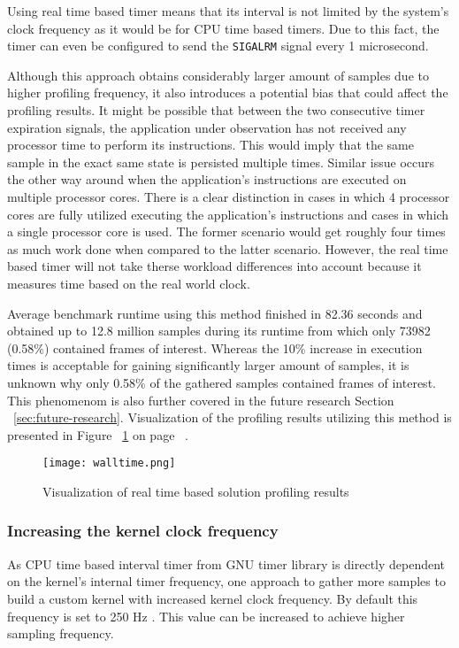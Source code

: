 \documentclass[..thesis.tex]{subfiles}
\begin{document}
Using real time based timer means that its interval is not limited by the system's clock frequency as it would be for CPU time based timers. Due to this fact, the timer can even be configured to send the \texttt{SIGALRM} signal every 1 microsecond.

Although this approach obtains considerably larger amount of samples due to higher profiling frequency, it also introduces a potential bias that could affect the profiling results. It might be possible that between the two consecutive timer expiration signals, the application under observation has not received any processor time to perform its instructions. This would imply that the same sample in the exact same state is persisted multiple times. Similar issue occurs the other way around when the application's instructions are executed on multiple processor cores. There is a clear distinction in cases in which 4 processor cores are fully utilized executing the application's instructions and cases in which a single processor core is used. The former scenario would get roughly four times as much work done when compared to the latter scenario. However, the real time based timer will not take therse workload differences into account because it measures time based on the real world clock.

Average benchmark runtime using this method finished in 82.36 seconds and obtained up to 12.8 million samples during its runtime from which only 73982 (0.58\%) contained frames of interest. Whereas the 10\% increase in execution times is acceptable for gaining significantly larger amount of samples, it is unknown why only 0.58\% of the gathered samples contained frames of interest. This phenomenom is also further covered in the future research Section ~\ref{sec:future-research}. Visualization of the profiling results utilizing this method is presented in Figure ~\ref{fig:walltime} on page ~\pageref{fig:walltime}.
\begin{figure}[H]
\texttt{[image: walltime.png]}
\caption{Visualization of real time based solution profiling results}
\label{fig:walltime}
\end{figure}

\subsubsection{Increasing the kernel clock frequency}
\label{kernel-clock}
As CPU time based interval timer from GNU timer library is directly dependent on the kernel's internal timer frequency, one approach to gather more samples to build a custom kernel with increased kernel clock frequency. By default this frequency is set to 250 Hz \cite{torvalds_linux:_2018}. This value can be increased to achieve higher sampling frequency. 
\end{document}
